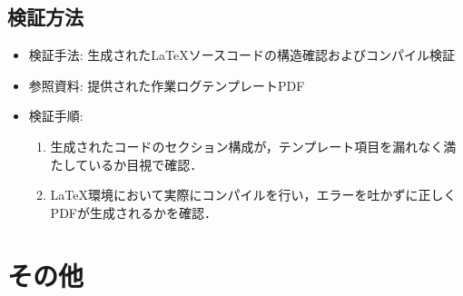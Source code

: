 \documentclass[uplatex,dvipdfmx]{jlreq}
\begin{document}
\subsection{検証方法}
\begin{itemize}
    \item  検証手法: 生成された\LaTeX ソースコードの構造確認およびコンパイル検証
    \item  参照資料: 提供された作業ログテンプレートPDF
    \item  検証手順:
    \begin{enumerate}
        \item 生成されたコードのセクション構成が，テンプレート項目を漏れなく満たしているか目視で確認．
        \item \LaTeX 環境において実際にコンパイルを行い，エラーを吐かずに正しくPDFが生成されるかを確認．
    \end{enumerate}
\end{itemize}

\section{その他}
\end{document}
